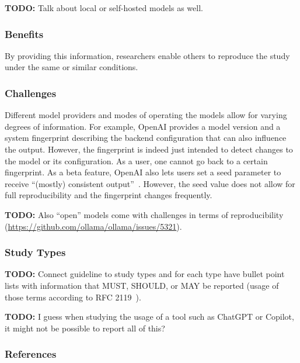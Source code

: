 \documentclass[11pt]{article}
\begin{document}
\textbf{TODO:} Talk about local or self-hosted models as well.

\subsubsection{Benefits}

By providing this information, researchers enable others to reproduce the study under the same or similar conditions.

\subsubsection{Challenges}

Different model providers and modes of operating the models allow for varying degrees of information.
For example, OpenAI provides a model version and a system fingerprint describing the backend configuration that can also influence the output.
However, the fingerprint is indeed just intended to detect changes to the model or its configuration.
As a user, one cannot go back to a certain fingerprint.
As a beta feature, OpenAI also lets users set a seed parameter to receive ``(mostly) consistent output''~\cite{OpenAI23}.
However, the seed value does not allow for full reproducibility and the fingerprint changes frequently. 

\textbf{TODO:} Also ``open'' models come with challenges in terms of reproducibility (\url{https://github.com/ollama/ollama/issues/5321}).

\subsubsection{Study Types}

\textbf{TODO:} Connect guideline to study types and for each type have bullet point lists with information that MUST, SHOULD, or MAY be reported (usage of those terms according to RFC 2119~\cite{rfc2119}).

\textbf{TODO:} I guess when studying the usage of a tool such as ChatGPT or Copilot, it might not be possible to report all of this?

\subsubsection{References}



\end{document}
